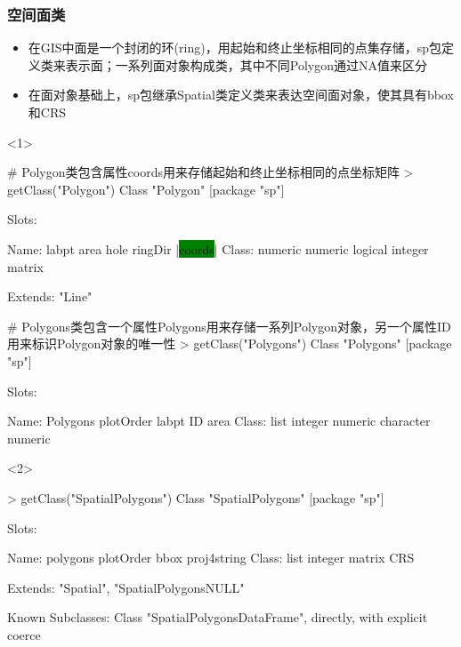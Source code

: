 \subsubsection{空间面类}
\begin{frame}[t,fragile]{\subsecname}{\subsubsecname}
\begin{itemize}
\item<1-> 在GIS中面是一个封闭的环(ring)，用起始和终止坐标相同的点集存储，sp包定义类来表示面；一系列面对象构成类，其中不同Polygon通过NA值来区分
\item<2-> 在面对象基础上，sp包继承Spatial类定义类来表达空间面对象，使其具有bbox和CRS
\end{itemize}

\begin{overlayarea}{\textwidth}{\textheight}
\begin{onlyenv}<1>
\begin{rcode}
# Polygon类包含属性coords用来存储起始和终止坐标相同的点坐标矩阵
> getClass("Polygon")
Class "Polygon" [package "sp"]

Slots:
                                              
Name:    labpt    area    hole ringDir  |\colorbox{green}{coords}|
Class: numeric numeric logical integer  matrix

Extends: "Line"

# Polygons类包含一个属性Polygons用来存储一系列Polygon对象，另一个属性ID用来标识Polygon对象的唯一性
> getClass("Polygons")
Class "Polygons" [package "sp"]

Slots:
                                                        
Name:   Polygons plotOrder     labpt        ID      area
Class:      list   integer   numeric character   numeric
\end{rcode}
\end{onlyenv}

\begin{onlyenv}<2>
\begin{rcode}
> getClass("SpatialPolygons")
Class "SpatialPolygons" [package "sp"]

Slots:
                                                      
Name:     polygons   plotOrder        bbox proj4string
Class:        list     integer      matrix         CRS

Extends: "Spatial", "SpatialPolygonsNULL"

Known Subclasses: 
Class "SpatialPolygonsDataFrame", directly, with explicit coerce
\end{rcode}
\end{onlyenv}
\end{overlayarea}
\end{frame}

